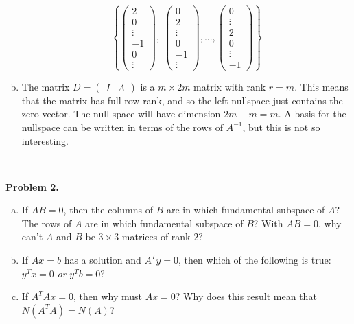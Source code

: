 \documentclass[11pt]{article}
\begin{document}
\begin{enumerate}[(a)]
$$\left\{\begin{pmatrix} 2 \\ 0 \\ \vdots \\ -1 \\0\\ \vdots \end{pmatrix}, \; \begin{pmatrix} 0 \\ 2 \\  \vdots \\ 0 \\ -1\\ \vdots \end{pmatrix}, ... , \begin{pmatrix} 0 \\ \vdots \\ 2 \\ 0 \\ \vdots \\ -1 \end{pmatrix}\right\}$$
\item The matrix $D = \begin{pmatrix} I & A \end{pmatrix}$ is a $m\times 2m$ matrix with rank $r=m$. This means that the matrix has full row rank, and so the left nullspace just contains the zero vector. The null space will have dimension $2m-m=m$. A basis for the nullspace can be written in terms of the rows of $A^{-1}$, but this is not so interesting. 
\end{enumerate}

\

\noindent \textbf{Problem 2.}\\
\begin{enumerate}[(a)]
\item If $AB=0$, then the columns of $B$ are in which fundamental subspace of $A$? The rows of $A$ are in which fundamental subspace of $B$? With $AB=0$, why can't $A$ and $B$ be $3\times 3$ matrices of rank $2$?
\item If $Ax = b$ has a solution and $A^Ty = 0$, then which of the following is true: $y^Tx = 0$ \emph{or} $y^Tb = 0$?
\item If $A^TAx = 0$, then why must $Ax=0$? Why does this result mean that $N(A^TA)=N(A)$?
\end{enumerate}
\end{document}
